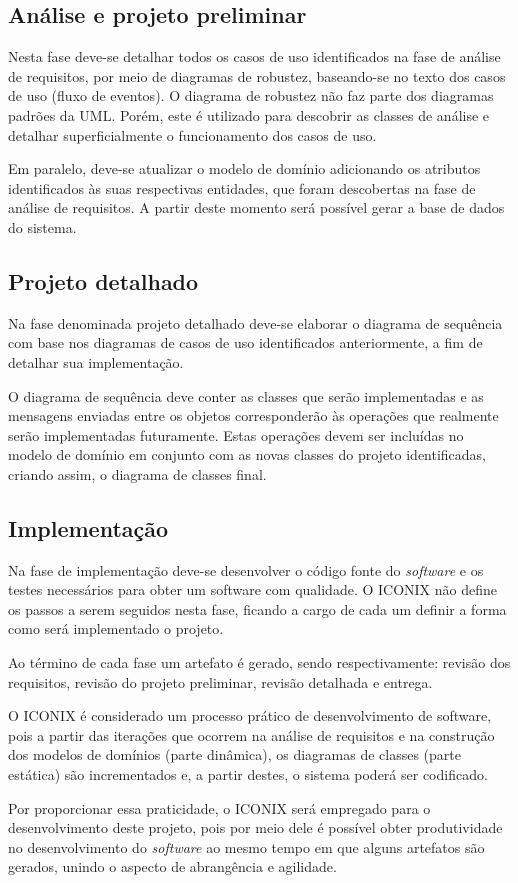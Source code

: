 \subsection{Análise e projeto preliminar}

Nesta fase deve-se detalhar todos os casos de uso identificados na fase de análise de requisitos, por meio de diagramas de robustez, baseando-se no texto dos casos de uso (fluxo de eventos). O diagrama de robustez não faz parte dos diagramas padrões da UML. Porém, este é utilizado para descobrir as classes de análise e detalhar superficialmente o funcionamento dos casos de uso.

Em paralelo, deve-se atualizar o modelo de domínio adicionando os atributos identificados às suas respectivas entidades, que foram descobertas na fase de análise de requisitos. A partir deste momento será possível gerar a base de dados do sistema.


\subsection{Projeto detalhado}

\par Na fase denominada projeto detalhado deve-se elaborar o diagrama de sequência com base nos diagramas de casos de uso identificados anteriormente, a fim de detalhar sua implementação.

O diagrama de sequência deve conter as classes que serão implementadas e as mensagens enviadas entre os objetos corresponderão às operações que realmente serão implementadas futuramente. Estas operações devem ser incluídas no modelo de domínio em conjunto com as novas classes do projeto identificadas, criando assim, o diagrama de classes final.

\subsection{Implementação}

Na fase de implementação deve-se desenvolver o código fonte do \textit{software} e os testes necessários para obter um software com qualidade. O ICONIX não define os passos a serem seguidos nesta fase, ficando a cargo de cada um definir a forma como será implementado o projeto.
 
Ao término de cada fase um artefato é gerado, sendo respectivamente: revisão dos requisitos, revisão do projeto preliminar, revisão detalhada e entrega.

O ICONIX é considerado um processo prático de desenvolvimento de software, pois a partir das iterações que ocorrem na análise de requisitos e na construção dos modelos de domínios (parte dinâmica), os diagramas de classes (parte estática) são incrementados e, a partir destes, o sistema poderá ser codificado.


Por proporcionar essa praticidade, o ICONIX será empregado para o desenvolvimento deste projeto, pois por meio dele é possível obter produtividade no desenvolvimento do \textit{software} ao mesmo tempo em que alguns artefatos são gerados, unindo o aspecto de abrangência e agilidade.
